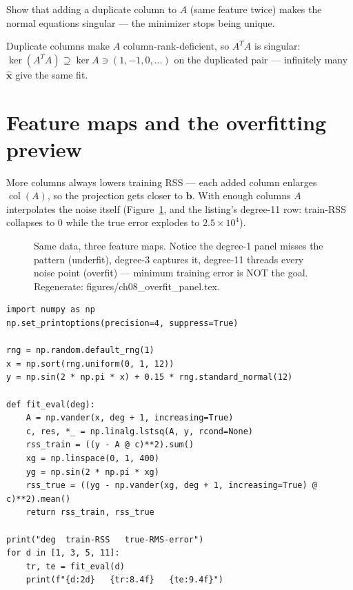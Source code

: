 \begin{exercise}[medium]
Show that adding a duplicate column to $A$ (same feature twice) makes the
normal equations singular --- the minimizer stops being unique.
\begin{solution}
Duplicate columns make $A$ column-rank-deficient, so $A^{T}A$ is singular:
$\ker(A^{T}A)\supseteq\ker A\ni(1,-1,0,\dots)$ on the duplicated pair ---
infinitely many $\hat{\mathbf x}$ give the same fit.
\end{solution}
\end{exercise}

\section{Feature maps and the overfitting preview}\label{sec:lstsq-overfit}

More columns always lowers training RSS --- each added column enlarges
$\operatorname{col}(A)$, so the projection gets closer to $\mathbf b$.
With enough columns $A$ interpolates the noise itself
(Figure~\ref{fig:overfit}, and the listing's degree-11 row: train-RSS
collapses to 0 while the true error explodes to $2.5\times10^{4}$).

\begin{figure}[htbp]
\centering

\caption{Same data, three feature maps. Notice the degree-1 panel misses
the pattern (underfit), degree-3 captures it, degree-11 threads every
noise point (overfit) --- minimum training error is NOT the goal.
Regenerate: \ttfamily figures/ch08\_overfit\_panel.tex.}
\label{fig:overfit}
\end{figure}

\begin{lstlisting}[caption={\ttfamily code/ch08\_poly\_overfit.py --- fit
degree $d$, report training RSS vs.\ error against the true function.}]
import numpy as np
np.set_printoptions(precision=4, suppress=True)

rng = np.random.default_rng(1)
x = np.sort(rng.uniform(0, 1, 12))
y = np.sin(2 * np.pi * x) + 0.15 * rng.standard_normal(12)

def fit_eval(deg):
    A = np.vander(x, deg + 1, increasing=True)
    c, res, *_ = np.linalg.lstsq(A, y, rcond=None)
    rss_train = ((y - A @ c)**2).sum()
    xg = np.linspace(0, 1, 400)
    yg = np.sin(2 * np.pi * xg)
    rss_true = ((yg - np.vander(xg, deg + 1, increasing=True) @ c)**2).mean()
    return rss_train, rss_true

print("deg  train-RSS   true-RMS-error")
for d in [1, 3, 5, 11]:
    tr, te = fit_eval(d)
    print(f"{d:2d}   {tr:8.4f}   {te:9.4f}")
\end{lstlisting}

